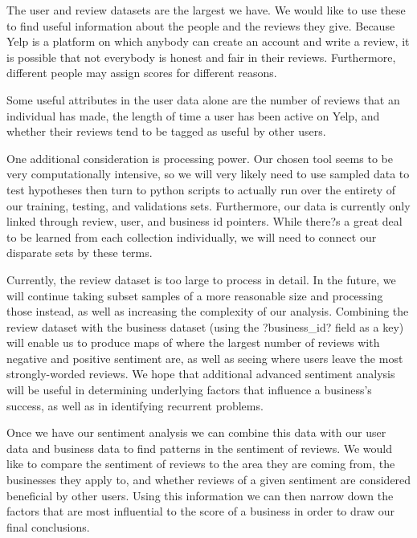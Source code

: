 \quad The user and review datasets are the largest we have. We would like to use these to find useful information about the people and the reviews they give. Because Yelp is a platform on which anybody can create an account and write a review, it is possible that not everybody is honest and fair in their reviews. Furthermore, different people may assign scores for different reasons. 

\quad Some useful attributes in the user data alone are the number of reviews that an individual has made, the length of time a user has been active on Yelp, and whether their reviews tend to be tagged as useful by other users. 

\quad One additional consideration is processing power. Our chosen tool seems to be very computationally intensive, so we will very likely need to use sampled data to test hypotheses then turn to python scripts to actually run over the entirety of our training, testing, and validations sets. Furthermore, our data is currently only linked through review, user, and business id pointers. While there?s a great deal to be learned from each collection individually, we will need to connect our disparate sets by these terms. 

\quad Currently, the review dataset is too large to process in detail. In the future, we will continue taking subset samples of a more reasonable size and processing those instead, as well as increasing the complexity of our analysis. Combining the review dataset with the business dataset (using the ?business\_id? field as a key) will enable us to produce maps of where the largest number of reviews with negative and positive sentiment are, as well as seeing where users leave the most strongly-worded reviews. We hope that additional advanced sentiment analysis will be useful in determining underlying factors that influence a business's success, as well as in identifying recurrent problems.

\quad Once we have our sentiment analysis we can combine this data with our user data and business data to find patterns in the sentiment of reviews. We would like to compare the sentiment of reviews to the area they are coming from, the businesses they apply to, and whether reviews of a given sentiment are considered beneficial by other users. Using this information we can then narrow down the factors that are most influential to the score of a business in order to draw our final conclusions.



